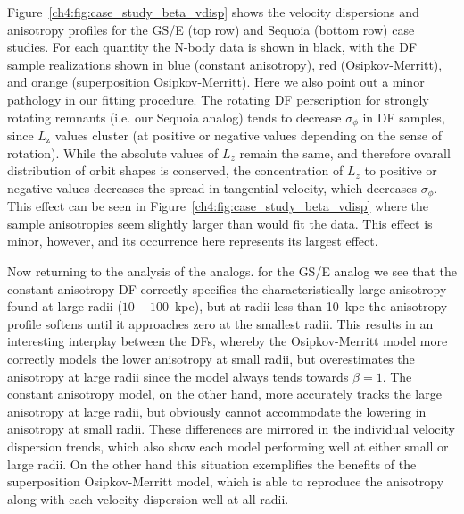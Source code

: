 Figure~\ref{ch4:fig:case_study_beta_vdisp} shows the velocity dispersions and anisotropy profiles for the GS/E (top row) and Sequoia (bottom row) case studies. For each quantity the N-body data is shown in black, with the DF sample realizations shown in blue (constant anisotropy), red (Osipkov-Merritt), and orange (superposition Osipkov-Merritt). Here we also point out a minor pathology in our fitting procedure. The rotating DF perscription for strongly rotating remnants (i.e. our Sequoia analog) tends to decrease $\sigma_{\phi}$ in DF samples, since $L_\mathrm{z}$ values cluster (at positive or negative values depending on the sense of rotation). While the absolute values of $L_{z}$ remain the same, and therefore ovarall distribution of orbit shapes is conserved, the concentration of $L_{z}$ to positive or negative values decreases the spread in tangential velocity, which decreases $\sigma_{\phi}$. This effect can be seen in Figure~\ref{ch4:fig:case_study_beta_vdisp} where the sample anisotropies seem slightly larger than would fit the data. This effect is minor, however, and its occurrence here represents its largest effect.

Now returning to the analysis of the analogs. for the GS/E analog we see that the constant anisotropy DF correctly specifies the characteristically large anisotropy found at large radii ($10-100$~kpc), but at radii less than 10~kpc the anisotropy profile softens until it approaches zero at the smallest radii. This results in an interesting interplay between the DFs, whereby the Osipkov-Merritt model more correctly models the lower anisotropy at small radii, but overestimates the anisotropy at large radii since the model always tends towards $\beta=1$. The constant anisotropy model, on the other hand, more accurately tracks the large anisotropy at large radii, but obviously cannot accommodate the lowering in anisotropy at small radii. These differences are mirrored in the individual velocity dispersion trends, which also show each model performing well at either small or large radii. On the other hand this situation exemplifies the benefits of the superposition Osipkov-Merritt model, which is able to reproduce the anisotropy along with each velocity dispersion well at all radii.


